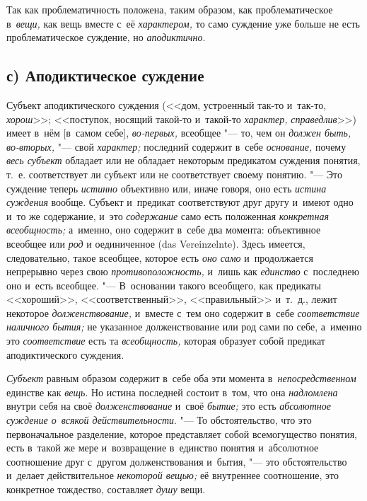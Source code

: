 \label{bkm:bm66b}Так как проблематичность положена, таким образом, как
проблематическое в~{\em вещи,} как вещь вместе с~её {\em характером,} то само
суждение уже больше не есть проблематическое суждение, но {\em аподиктично}.

\subsection[с) Аподиктическое суждение]{с) Аподиктическое суждение}

Субъект аподиктического суждения (<<дом, устроенный так-то и~так-то,
{\em хорош}>>; <<поступок, носящий такой-то и~такой-то {\em характер,}
{\em справедлив}>>) имеет в~нём [в~самом себе], {\em во-первых,}
всеобщее "--- то, чем он {\em должен быть, во-вторых,} "--- свой
{\em характер;} последний содержит в~себе {\em основание,} почему
{\em весь субъект} обладает или не обладает некоторым предикатом суждения
понятия, т.~е. соответствует ли субъект или не соответствует своему
понятию. "--- Это суждение теперь {\em истинно} объективно или, иначе говоря,
оно есть {\em истина суждения} вообще. Субъект и~предикат соответствуют друг
другу и~имеют одно и~то же содержание, и~это {\em содержание} само есть
положенная {\em конкретная всеобщность;} а~именно, оно содержит в~себе два
момента: объективное всеобщее или {\em род} и
оединиченное (das Verein\-zelnte). Здесь имеется, следовательно, такое
всеобщее, которое есть {\em оно само} и~продолжается непрерывно через свою
{\em противоположность,} и~лишь как {\em единство} с~последнею оно и~есть
всеобщее. "--- В~основании такого всеобщего, как предикаты <<хороший>>,
<<соответственный>>, <<правильный>> и~т.~д., лежит некоторое
{\em долженствование,} и~вместе с~тем оно содержит в~себе {\em соответствие
наличного бытия;} не указанное долженствование или род сами по себе, а~именно
это {\em соответствие} есть та {\em всеобщность,} которая образует собой
предикат аподиктического суждения.

{\em Субъект} равным образом содержит в~себе оба эти момента
в~{\em непосредственном} единстве как {\em вещь}. Но истина последней состоит
в~том, что она {\em надломлена} внутри себя на своё {\em долженствование}
и~своё {\em бытие;} это есть {\em абсолютное суждение о~всякой
действительности}. "--- То обстоятельство,
что это первоначальное разделение, которое представляет собой всемогущество
понятия, есть в~такой же мере и~возвращение в~единство понятия и~абсолютное
соотношение друг с~другом долженствования и~бытия, "--- это обстоятельство
и~делает действительное {\em некоторой вещью;} её внутреннее соотношение,
это конкретное тождество, составляет {\em душу} вещи.

